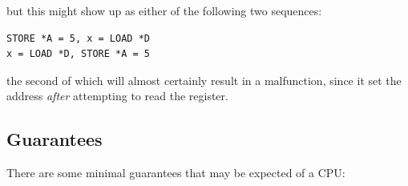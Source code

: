 but this might show up as either of the following two sequences:

\vspace{5pt}
\begin{minipage}[t]{\columnwidth}
\scriptsize
\begin{verbatim}
STORE *A = 5, x = LOAD *D
x = LOAD *D, STORE *A = 5
\end{verbatim}
\end{minipage}
\vspace{5pt}

the second of which will almost certainly result in a malfunction, since it set
the address \emph{after} attempting to read the register.

\subsection{Guarantees}
\label{sec:advsync:Guarantees}

There are some minimal guarantees that may be expected of a CPU:

